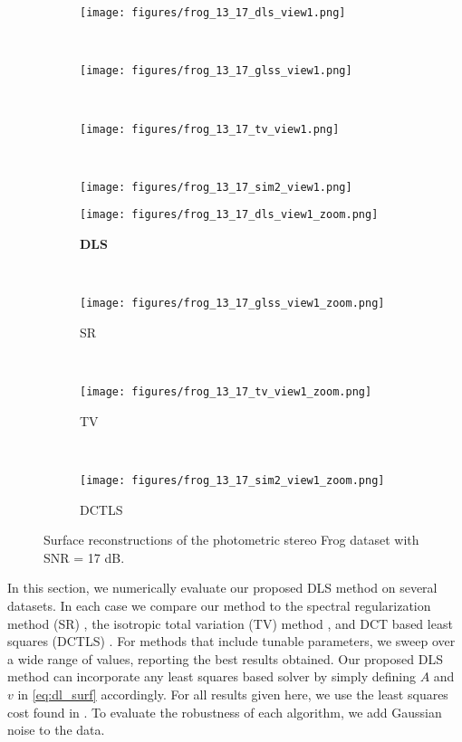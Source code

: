 
\begin{figure*}
\centering
\begin{subfigure}[b]{0.23\textwidth}
  \texttt{[image: figures/frog\_13\_17\_dls\_view1.png]}
\end{subfigure}
~ 
\begin{subfigure}[b]{0.23\textwidth}
  \texttt{[image: figures/frog\_13\_17\_glss\_view1.png]}
\end{subfigure}
~ %
\begin{subfigure}[b]{0.23\textwidth}
  \texttt{[image: figures/frog\_13\_17\_tv\_view1.png]}
\end{subfigure}
~
\begin{subfigure}[b]{0.23\textwidth}
  \texttt{[image: figures/frog\_13\_17\_sim2\_view1.png]}
\end{subfigure}
\end{figure*}

\setcounter{figure}{2}  

\begin{figure*}
\centering
\begin{subfigure}[b]{0.23\textwidth}
  \texttt{[image: figures/frog\_13\_17\_dls\_view1\_zoom.png]}
  \caption{\textbf{DLS}}
\end{subfigure}
~ 
\begin{subfigure}[b]{0.23\textwidth}
  \texttt{[image: figures/frog\_13\_17\_glss\_view1\_zoom.png]}
  \caption{SR}
\end{subfigure}
~ %
\begin{subfigure}[b]{0.23\textwidth}
  \texttt{[image: figures/frog\_13\_17\_tv\_view1\_zoom.png]}
  \caption{TV}
\end{subfigure}
~
\begin{subfigure}[b]{0.23\textwidth}
  \texttt{[image: figures/frog\_13\_17\_sim2\_view1\_zoom.png]}
  \caption{DCTLS}
\end{subfigure}
\caption{Surface reconstructions of the photometric stereo Frog dataset \cite{xiong2015shading} with SNR = 17 dB.}
\label{fig:frog_zoomed}
\end{figure*}

In this section, we numerically evaluate our proposed DLS method on several datasets. In each case we compare our method to the spectral regularization method (SR) \cite{harker2015}, the isotropic total variation (TV) method \cite{queau2015}, and DCT based least squares (DCTLS) \cite{simchony1990}. For methods that include tunable parameters, we sweep over a wide range of values, reporting the best results obtained. Our proposed DLS method can incorporate any least squares based solver by simply defining $A$ and $v$ in \eqref{eq:dl_surf} accordingly. For all results given here, we use the least squares cost found in \cite{simchony1990}. To evaluate the robustness of each algorithm, we add Gaussian noise to the data.

